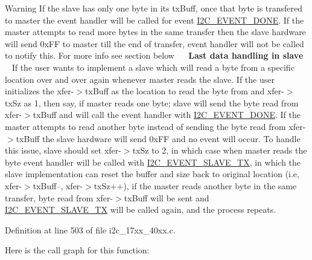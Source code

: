 \begin{DoxyWarning}{Warning}
If the slave has only one byte in its tx\+Buff, once that byte is transfered to master the event handler will be called for event \hyperlink{group__I2C__17XX__40XX_ggacb2cd4e03ea48339d327e4f387441bf3a43d00f7d92100d4af6df5514e4ccf1d1}{I2\+C\+\_\+\+E\+V\+E\+N\+T\+\_\+\+D\+O\+NE}. If the master attempts to read more bytes in the same transfer then the slave hardware will send 0x\+FF to master till the end of transfer, event handler will not be called to notify this. For more info see section below~\newline
 ~\newline
{\bfseries  Last data handling in slave }~\newline
 If the user wants to implement a slave which will read a byte from a specific location over and over again whenever master reads the slave. If the user initializes the xfer-\/$>$tx\+Buff as the location to read the byte from and xfer-\/$>$tx\+Sz as 1, then say, if master reads one byte; slave will send the byte read from xfer-\/$>$tx\+Buff and will call the event handler with \hyperlink{group__I2C__17XX__40XX_ggacb2cd4e03ea48339d327e4f387441bf3a43d00f7d92100d4af6df5514e4ccf1d1}{I2\+C\+\_\+\+E\+V\+E\+N\+T\+\_\+\+D\+O\+NE}. If the master attempts to read another byte instead of sending the byte read from xfer-\/$>$tx\+Buff the slave hardware will send 0x\+FF and no event will occur. To handle this issue, slave should set xfer-\/$>$tx\+Sz to 2, in which case when master reads the byte event handler will be called with \hyperlink{group__I2C__17XX__40XX_ggacb2cd4e03ea48339d327e4f387441bf3a3911d9b6505f77f0bed3f21b2710ca58}{I2\+C\+\_\+\+E\+V\+E\+N\+T\+\_\+\+S\+L\+A\+V\+E\+\_\+\+TX}, in which the slave implementation can reset the buffer and size back to original location (i.\+e, xfer-\/$>$tx\+Buff--, xfer-\/$>$tx\+Sz++), if the master reads another byte in the same transfer, byte read from xfer-\/$>$tx\+Buff will be sent and \hyperlink{group__I2C__17XX__40XX_ggacb2cd4e03ea48339d327e4f387441bf3a3911d9b6505f77f0bed3f21b2710ca58}{I2\+C\+\_\+\+E\+V\+E\+N\+T\+\_\+\+S\+L\+A\+V\+E\+\_\+\+TX} will be called again, and the process repeats. 
\end{DoxyWarning}


Definition at line 503 of file i2c\+\_\+17xx\+\_\+40xx.\+c.



Here is the call graph for this function\+:


